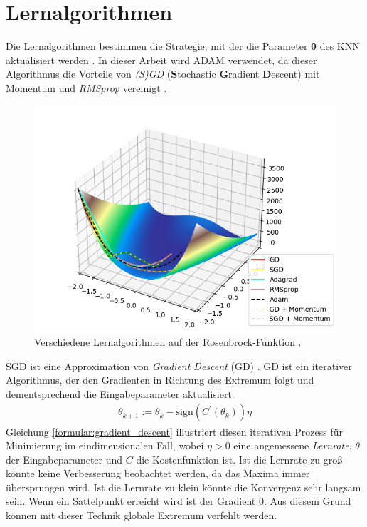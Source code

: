 \section{Lernalgorithmen}
Die Lernalgorithmen bestimmen die Strategie, mit der die Parameter $\boldsymbol\theta$ des KNN aktualisiert werden \cite{higham2019deep}.
In dieser Arbeit wird ADAM verwendet, da dieser Algorithmus die Vorteile von \textit{(S)GD} (\textbf{S}tochastic \textbf{G}radient \textbf{D}escent)
mit Momentum und \textit{RMSprop} vereinigt \cite{kingma2014adam, higham2019deep}.
\begin{figure}[h!]
    \centering
    \includegraphics[width=0.8\linewidth]{images/learn_algorithms.png}
    \caption{Verschiedene Lernalgorithmen auf der Rosenbrock-Funktion \cite{rosenbrock}.}
    \label{fig:learn_algorithms}
\end{figure}
\newline
SGD ist eine Approximation von \textit{Gradient Descent} (GD) \cite{bengio2017deep}.
GD ist ein iterativer Algorithmus, der den Gradienten in Richtung des Extremum folgt und dementsprechend die Eingabeparameter aktualisiert.
\begin{align}
    \label{formular:gradient_descent}
    \theta_{k+1} := \theta_k - \text{sign}(C^{\prime}(\theta_k))\eta
\end{align}
Gleichung \ref{formular:gradient_descent} illustriert diesen iterativen Prozess für Minimierung im eindimensionalen Fall,
wobei $\eta > 0$ eine angemessene \textit{Lernrate}, $\theta$ der Eingabeparameter und $C$ die Kostenfunktion ist.
Ist die Lernrate zu groß könnte keine Verbesserung beobachtet werden, da das Maxima immer übersprungen wird.
Ist die Lernrate zu klein könnte die Konvergenz sehr langsam sein.
Wenn ein Sattelpunkt erreicht wird ist der Gradient 0.
Aus diesem Grund können mit dieser Technik globale Extremum verfehlt werden.
